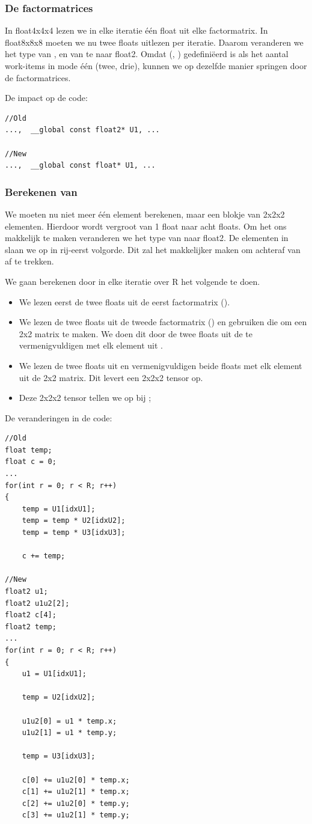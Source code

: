 \subsubsection{De factormatrices}
In float4x4x4 lezen we in elke iteratie \'e\'en float uit elke factormatrix. In float8x8x8 moeten we nu twee floats uitlezen per iteratie. Daarom veranderen we het type van ,  en van  te naar float2. Omdat  (, ) gedefini\"eerd is als het aantal work-items in mode \'e\'en (twee, drie), kunnen we op dezelfde manier springen door de factormatrices.

De impact op de code:
\begin{lstlisting}
//Old
...,  __global const float2* U1, ...

//New
...,  __global const float* U1, ...
\end{lstlisting}


\subsubsection{Berekenen van \CC{}}
We moeten nu niet meer \'e\'en element berekenen, maar een blokje van 2x2x2 elementen. Hierdoor wordt \CC{} vergroot van 1 float naar acht floats. Om het ons makkelijk te maken veranderen we het type van \CC{} naar float2. De elementen in \CC{} slaan we op in rij-eerst volgorde. Dit zal het makkelijker maken om achteraf \TT{} van \CC{} af te trekken.

We gaan \CC{} berekenen door in elke iteratie over R het volgende te doen.
\begin{itemize}
    \item We lezen eerst de twee floats uit de eerst factormatrix ().
    \item We lezen de twee floats uit de tweede factormatrix () en gebruiken die om een 2x2 matrix te maken. We doen dit door de twee floats uit de  te vermenigvuldigen met elk element uit .
    \item We lezen de twee floats uit  en vermenigvuldigen beide floats met elk element uit de 2x2 matrix. Dit levert een 2x2x2 tensor op.
    \item Deze 2x2x2 tensor tellen we op bij \CC{};
\end{itemize}

De veranderingen in de code:
\begin{lstlisting}
//Old
float temp;
float c = 0;
...
for(int r = 0; r < R; r++)
{
	temp = U1[idxU1];
	temp = temp * U2[idxU2];
	temp = temp * U3[idxU3];

	c += temp;

//New
float2 u1;
float2 u1u2[2];
float2 c[4];
float2 temp;
...
for(int r = 0; r < R; r++)
{ 
	u1 = U1[idxU1];

	temp = U2[idxU2];

	u1u2[0] = u1 * temp.x;
	u1u2[1] = u1 * temp.y;

	temp = U3[idxU3];

	c[0] += u1u2[0] * temp.x;
	c[1] += u1u2[1] * temp.x;
	c[2] += u1u2[0] * temp.y;
	c[3] += u1u2[1] * temp.y;
\end{lstlisting}

